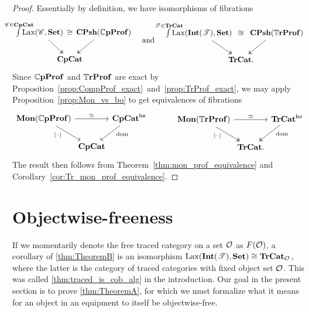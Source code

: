 \documentclass[11pt,oneside,article]{memoir}
\begin{document}
\begin{proof}
   Essentially by definition, we have isomorphisms of fibrations
   \begin{equation*}
      \begin{tikzcd}[column sep=-2em]
         \int\limits^{\mathclap{\cat{C}\in\CompCat}}\Lax(\cat{C},\Set)~
               \ar[rr,phantom,"\iso"] \ar[dr,two heads]
            && ~\CPsh(\dCompProf) \ar[dl,two heads] \\
         & \CompCat &
      \end{tikzcd}
      \quad\text{and}\quad
      \begin{tikzcd}[column sep=-2em]
         \int\limits^{\mathclap{\cat{T}\in\TrCat}}\Lax(\Int(\cat{T}),\Set)~~
               \ar[rr,phantom,"\iso"] \ar[dr,two heads]
            && ~~\CPsh(\dTrProf) \ar[dl,two heads] \\
         & \TrCat. &
      \end{tikzcd}
   \end{equation*}
   Since $\mathbb{C}\mathbf{pProf}$ and $\mathbb{T}\mathbf{rProf}$ are exact by Proposition~\ref{prop:CompProf_exact}~and~\ref{prop:TrProf_exact}, we may apply Proposition~\ref{prop:Mon_vs_bo} to get equivalences of fibrations
   \begin{equation*}
      \begin{tikzcd}[column sep=0em]
         \Mon(\dCompProf) \ar[rr,"\equiv"] \ar[dr,"\MOb"' pos=.3]
            && \CompCat^{\bo} \ar[dl,"\dom" pos=.3] \\
         & \CompCat &
      \end{tikzcd}
      \qquad\quad
      \begin{tikzcd}[column sep=0em]
         \Mon(\dTrProf) \ar[rr,"\equiv"] \ar[dr,two heads,"\MOb"' pos=.3]
            && \TrCat^{\bo} \ar[dl,two heads,"\dom" pos=.3] \\
         & \TrCat. &
      \end{tikzcd}
   \end{equation*}
   The result then follows from Theorem~\ref{thm:mon_prof_equivalence} and Corollary~\ref{cor:Tr_mon_prof_equivalence}.
\end{proof}

\section{Objectwise-freeness}
      \label{sec:monoids_on_free}

If we momentarily denote the free traced category on a set $\mathcal{O}$ as $F(\mathcal{O})$, a corollary of \ref{thm:TheoremB} is an isomorphism $\operatorname{Lax}(\mathbf{Int}(\mathscr{T}),\mathbf{Set})\cong\mathbf{TrCat}_{\mathcal{O}}$, where the latter is the category of traced categories with fixed object set $\mathcal{O}$. This was called \ref{thm:traced_is_cob_alg} in the introduction. Our goal in the present section is to prove \ref{thm:TheoremA}, for which we must formalize what it means for an object in an equipment to itself be objectwise-free.
\end{document}

